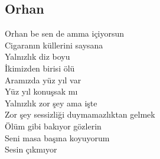 \subsection{Orhan}

Orhan be sen de amma içiyorsun \\
Cigaranın küllerini saysana \\
Yalnızlık diz boyu \\
İkimizden birisi ölü \\
Aramızda yüz yıl var \\
Yüz yıl konuşsak mı \\
Yalnızlık zor şey ama işte \\
Zor şey sessizliği duymamazlıktan gelmek \\
Ölüm gibi bakıyor gözlerin \\
Seni masa başına koyuyorum \\
Sesin çıkmıyor